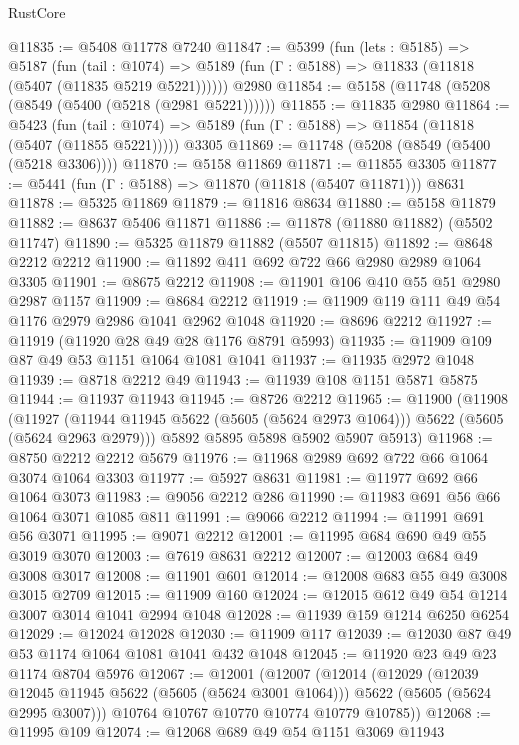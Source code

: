 \begin{lexlean}{RustCore}
\begin{coremodule}
@11835 := @5408 @11778 @7240
@11847 := @5399
    (fun (lets : @5185) =>
    @5187
      (fun (tail : @1074) =>
      @5189 (fun (Γ : @5188) => @11833 (@11818 (@5407 (@11835 @5219 @5221))))))
    @2980
@11854 := @5158 (@11748 (@5208 (@8549 (@5400 (@5218 (@2981 @5221))))))
@11855 := @11835 @2980
@11864 := @5423
    (fun (tail : @1074) => @5189 (fun (Γ : @5188) => @11854 (@11818 (@5407 (@11855 @5221)))))
    @3305
@11869 := @11748 (@5208 (@8549 (@5400 (@5218 @3306))))
@11870 := @5158 @11869
@11871 := @11855 @3305
@11877 := @5441 (fun (Γ : @5188) => @11870 (@11818 (@5407 @11871))) @8631
@11878 := @5325 @11869
@11879 := @11816 @8634
@11880 := @5158 @11879
@11882 := @8637 @5406 @11871
@11886 := @11878 (@11880 @11882) (@5502 @11747)
@11890 := @5325 @11879 @11882 (@5507 @11815)
@11892 := @8648 @2212 @2212
@11900 := @11892 @411 @692 @722 @66 @2980 @2989 @1064 @3305
@11901 := @8675 @2212
@11908 := @11901 @106 @410 @55 @51 @2980 @2987 @1157
@11909 := @8684 @2212
@11919 := @11909 @119 @111 @49 @54 @1176 @2979 @2986 @1041 @2962 @1048
@11920 := @8696 @2212
@11927 := @11919 (@11920 @28 @49 @28 @1176 @8791 @5993)
@11935 := @11909 @109 @87 @49 @53 @1151 @1064 @1081 @1041
@11937 := @11935 @2972 @1048
@11939 := @8718 @2212 @49
@11943 := @11939 @108 @1151 @5871 @5875
@11944 := @11937 @11943
@11945 := @8726 @2212
@11965 := @11900
    (@11908
      (@11927 (@11944 @11945 @5622 (@5605 (@5624 @2973 @1064))) @5622 (@5605 (@5624 @2963 @2979)))
      @5892
      @5895
      @5898
      @5902
      @5907
      @5913)
@11968 := @8750 @2212 @2212 @5679
@11976 := @11968 @2989 @692 @722 @66 @1064 @3074 @1064 @3303
@11977 := @5927 @8631
@11981 := @11977 @692 @66 @1064 @3073
@11983 := @9056 @2212 @286
@11990 := @11983 @691 @56 @66 @1064 @3071 @1085 @811
@11991 := @9066 @2212
@11994 := @11991 @691 @56 @3071
@11995 := @9071 @2212
@12001 := @11995 @684 @690 @49 @55 @3019 @3070
@12003 := @7619 @8631 @2212
@12007 := @12003 @684 @49 @3008 @3017
@12008 := @11901 @601
@12014 := @12008 @683 @55 @49 @3008 @3015 @2709
@12015 := @11909 @160
@12024 := @12015 @612 @49 @54 @1214 @3007 @3014 @1041 @2994 @1048
@12028 := @11939 @159 @1214 @6250 @6254
@12029 := @12024 @12028
@12030 := @11909 @117
@12039 := @12030 @87 @49 @53 @1174 @1064 @1081 @1041 @432 @1048
@12045 := @11920 @23 @49 @23 @1174 @8704 @5976
@12067 := @12001
    (@12007
      (@12014
        (@12029
          (@12039 @12045 @11945 @5622 (@5605 (@5624 @3001 @1064)))
          @5622
          (@5605 (@5624 @2995 @3007)))
        @10764
        @10767
        @10770
        @10774
        @10779
        @10785))
@12068 := @11995 @109
@12074 := @12068 @689 @49 @54 @1151 @3069 @11943

\end{coremodule}
\end{lexlean}
